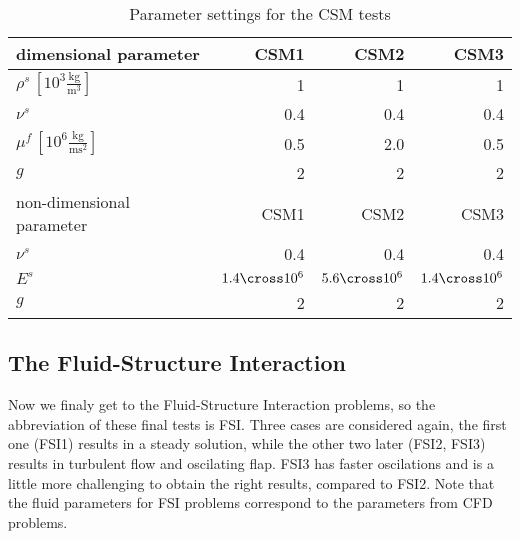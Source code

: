 \begin{table}\label{table:CSM_constants}
\centering
\begin{tabular}{|l|r|r|r|}
  \hline
  dimensional parameter                               & CSM1 & CSM2 & CSM3 \\
  \hline
  $\rho^s\,[10^3 \frac{\mathrm{kg}}{\mathrm{m}^3}]$   &    1 &    1 &    1 \\
  $\nu^s$                                             &  0.4 &  0.4 &  0.4 \\
  $\mu^f\,[10^{6} \frac{\mathrm{kg}}{\mathrm{ms}^2}]$ &  0.5 &  2.0 &  0.5 \\
  \hline
  $g$                                                 &    2 &    2 &    2 \\
  \hline \hline
  non-dimensional parameter                           & CSM1 & CSM2 & CSM3 \\
  \hline
  $\nu^s$                                             &  0.4 &  0.4 &  0.4 \\
  $E^s$                   & $1.4\cross10^6$ &  $5.6\cross10^6$ &  $1.4\cross10^6$ \\
  \hline
  $g$                                                 &    2 &    2 &    2 \\
  \hline
\end{tabular}
  \caption{Parameter settings for the CSM tests}
\end{table}



\subsection{The Fluid-Structure Interaction}
Now we finaly get to the Fluid-Structure Interaction problems, so the abbreviation of these final 
tests is FSI. Three cases are considered again, the first one (FSI1) results in a steady solution,
while the other two later (FSI2, FSI3) results in turbulent  flow and oscilating flap.
FSI3 has faster oscilations and is a little more challenging to obtain the right results, 
compared to FSI2.
Note that the fluid parameters for FSI problems correspond to the parameters from CFD problems.

